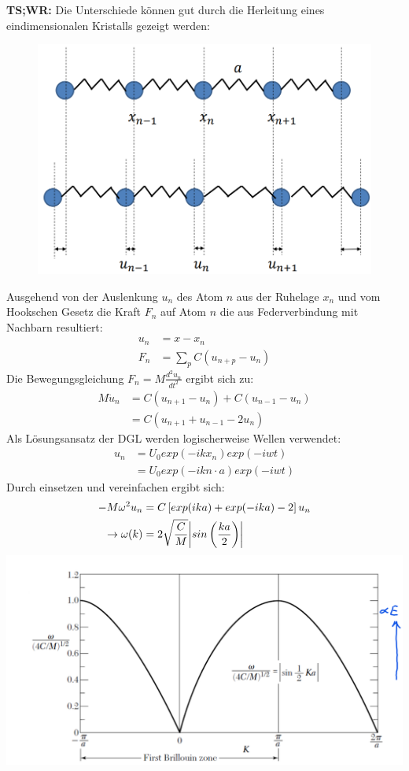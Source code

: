 \textbf{TS;WR:} Die Unterschiede können gut durch die Herleitung eines eindimensionalen Kristalls gezeigt werden:\\
\begin{minipage}[t]{0.44\textwidth}
    \centering
    \begin{figure}[H]
        \includegraphics[width=0.7\linewidth]{resources/16-03-2012/q49_same_mass.png}
    \end{figure}
    Ausgehend von der Auslenkung $u_n$ des Atom $n$ aus der Ruhelage $x_n$ und vom Hookschen Gesetz die Kraft $F_n$ auf Atom $n$ die aus Federverbindung mit Nachbarn resultiert:
    \begin{align*}
        u_n &= x - x_n\\
        F_n &= \sum_{p} C \left(u_{n+p} - u_n\right)
    \end{align*}
    Die Bewegungsgleichung $F_n = M \frac{d^2 u_n}{dt^2}$ ergibt sich zu:
    \begin{align*}
        M \ddot{u}_n &= C\left(u_{n+1} - u_n\right) + C\left(u_{n-1} - u_n\right)\\
        &= C\left(u_{n+1} + u_{n-1} - 2u_n\right)
    \end{align*}
    Als Lösungsansatz der DGL werden logischerweise Wellen verwendet:
    \begin{align*}
        u_n &= U_0 exp(-ikx_n)exp(-iwt)\\
            &= U_0 exp(-ikn\cdot a)exp(-iwt)
    \end{align*}
    Durch einsetzen und vereinfachen ergibt sich:
    \begin{align*}
        -M \omega^2 u_n &= C\left[exp(ika) + exp(-ika) - 2\right] u_n\\
        \rightarrow \omega(k) &= 2 \sqrt{\frac{C}{M}} \abs{sin\left(\frac{ka}{2}\right)}
    \end{align*}
    \includegraphics[width=0.9\linewidth]{resources/16-03-2012/q49_same_mass_disp.png}

\end{minipage}
